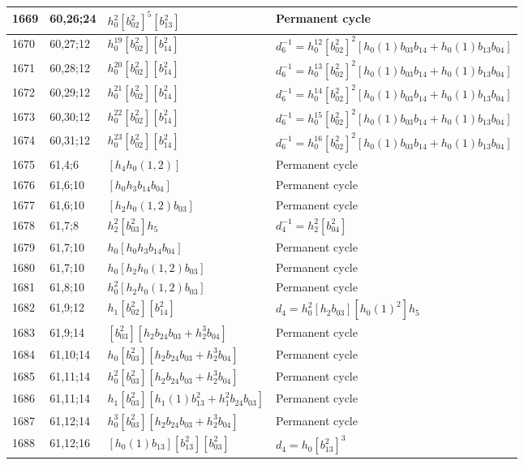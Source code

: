 \documentclass{article}
\begin{document}
\begin{longtable}{|l|l|>{\raggedright\arraybackslash}p{6cm}|>{\raggedright\arraybackslash}p{6cm}|}
\hline
1669 & 60,26;24 & $h_0^2[b_{02}^2]^5[b_{13}^2]$ & Permanent cycle\\
\hline
1670 & 60,27;12 & $h_0^{19}[b_{02}^2][b_{14}^2]$ & $d_{6}^{-1}=h_0^{12}[b_{02}^2]^2[h_0(1)b_{03}b_{14} + h_0(1)b_{13}b_{04}]$\\
\hline
1671 & 60,28;12 & $h_0^{20}[b_{02}^2][b_{14}^2]$ & $d_{6}^{-1}=h_0^{13}[b_{02}^2]^2[h_0(1)b_{03}b_{14} + h_0(1)b_{13}b_{04}]$\\
\hline
1672 & 60,29;12 & $h_0^{21}[b_{02}^2][b_{14}^2]$ & $d_{6}^{-1}=h_0^{14}[b_{02}^2]^2[h_0(1)b_{03}b_{14} + h_0(1)b_{13}b_{04}]$\\
\hline
1673 & 60,30;12 & $h_0^{22}[b_{02}^2][b_{14}^2]$ & $d_{6}^{-1}=h_0^{15}[b_{02}^2]^2[h_0(1)b_{03}b_{14} + h_0(1)b_{13}b_{04}]$\\
\hline
1674 & 60,31;12 & $h_0^{23}[b_{02}^2][b_{14}^2]$ & $d_{6}^{-1}=h_0^{16}[b_{02}^2]^2[h_0(1)b_{03}b_{14} + h_0(1)b_{13}b_{04}]$\\
\hline
1675 & 61,4;6 & $[h_4h_0(1, 2)]$ & Permanent cycle\\
\hline
1676 & 61,6;10 & $[h_0h_3b_{14}b_{04}]$ & Permanent cycle\\
1677 & 61,6;10 & $[h_2h_0(1, 2)b_{03}]$ & Permanent cycle\\
\hline
1678 & 61,7;8 & $h_2^2[b_{03}^2]h_5$ & $d_{4}^{-1}=h_2^2[b_{04}^2]$\\
\hline
1679 & 61,7;10 & $h_0[h_0h_3b_{14}b_{04}]$ & Permanent cycle\\
1680 & 61,7;10 & $h_0[h_2h_0(1, 2)b_{03}]$ & Permanent cycle\\
\hline
1681 & 61,8;10 & $h_0^2[h_2h_0(1, 2)b_{03}]$ & Permanent cycle\\
\hline
1682 & 61,9;12 & $h_1[b_{02}^2][b_{14}^2]$ &$d_{4}=h_0^2[h_2b_{03}][h_0(1)^2]h_5$\\
\hline
1683 & 61,9;14 & $[b_{03}^2][h_2b_{24}b_{03} + h_2^3b_{04}]$ & Permanent cycle\\
\hline
1684 & 61,10;14 & $h_0[b_{03}^2][h_2b_{24}b_{03} + h_2^3b_{04}]$ & Permanent cycle\\
\hline
1685 & 61,11;14 & $h_0^2[b_{03}^2][h_2b_{24}b_{03} + h_2^3b_{04}]$ & Permanent cycle\\
1686 & 61,11;14 & $h_1[b_{03}^2][h_1(1)b_{13}^2 + h_1^2b_{24}b_{03}]$ & Permanent cycle\\
\hline
1687 & 61,12;14 & $h_0^3[b_{03}^2][h_2b_{24}b_{03} + h_2^3b_{04}]$ & Permanent cycle\\
\hline
1688 & 61,12;16 & $[h_0(1)b_{13}][b_{13}^2][b_{03}^2]$ &$d_{4}=h_0[b_{13}^2]^3$\\

\end{longtable}
\end{document}
